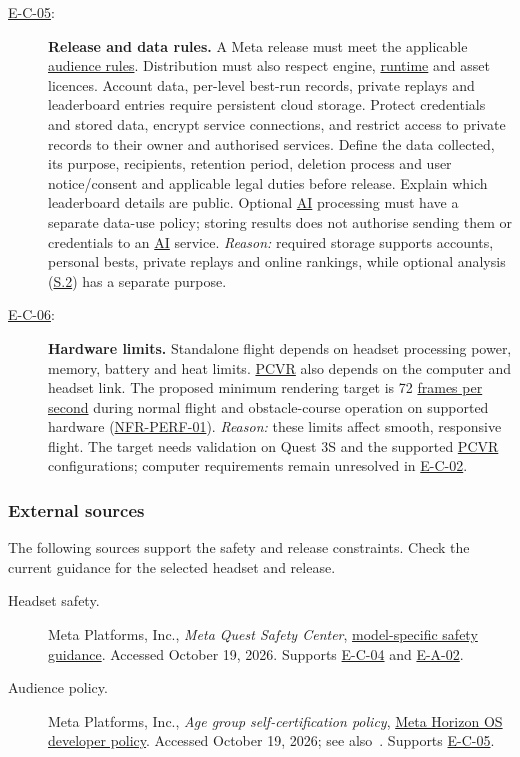 \documentclass[12pt]{article}
\begin{document}
\begin{description}
\item[{\hyperref[et-release]{E-C-05}:}]\label{ec-release}
\textbf{Release and data rules.}
A Meta release must meet the applicable
\hyperref[es-meta-age]{audience rules}. Distribution must also
respect engine, \hyperlink{glos:Runtime}{runtime} and asset licences. Account data,
per-level best-run records, private replays and leaderboard entries require
persistent cloud storage. Protect
credentials and stored data, encrypt service connections, and restrict access
to private records to their owner and authorised services. Define the data
collected, its purpose, recipients, retention period, deletion process and user
notice/consent and applicable legal duties before release. Explain which
leaderboard details are public.
Optional \hyperlink{glos:AI}{AI} processing must have a separate data-use policy; storing results
does not authorise sending them or credentials to an \hyperlink{glos:AI}{AI} service.
\textit{Reason:} required storage supports accounts, personal bests, private replays and online
rankings, while optional analysis (\hyperref[sec:s2-ai]{S.2}) has a separate purpose.

\item[{\hyperref[et-resources]{E-C-06}:}]\label{ec-resources}
\textbf{Hardware limits.}
Standalone flight depends on headset processing power, memory, battery and heat
limits. \hyperlink{glos:PCVR}{PCVR} also depends on the computer and headset link.
The proposed minimum rendering target is \hypertarget{gl:FPS}{}72 \hyperlink{glos:FPS}{frames per second} during normal
flight and obstacle-course operation on supported hardware
(\hyperref[sec:s2-nfr]{NFR-PERF-01}).
\textit{Reason:} these limits affect smooth, responsive flight. The target needs
validation on Quest 3S and the supported \hyperlink{glos:PCVR}{PCVR} configurations; computer requirements
remain unresolved in \hyperref[ec-hardware]{E-C-02}.
\end{description}

\subsubsection*{External sources}
The following sources support the safety and release constraints. Check the
current guidance for the selected headset and release.
\begin{description}
\item[Headset safety.]\label{es-meta-safety}
Meta Platforms, Inc., \textit{Meta Quest Safety Center},
\href{https://www.meta.com/quest/safety-center/}{model-specific safety guidance}.
Accessed October 19, 2026. Supports \hyperref[ec-safety]{E-C-04} and
\hyperref[ea-space]{E-A-02}.
\item[Audience policy.]\label{es-meta-age}
Meta Platforms, Inc., \textit{Age group self-certification policy},
\href{https://developers.meta.com/vr/policy/age-groups/}{Meta Horizon OS developer policy}.
Accessed October 19, 2026; see also~\cite{metaAgeGroups}.
Supports \hyperref[ec-release]{E-C-05}.
\end{description}
\end{document}
